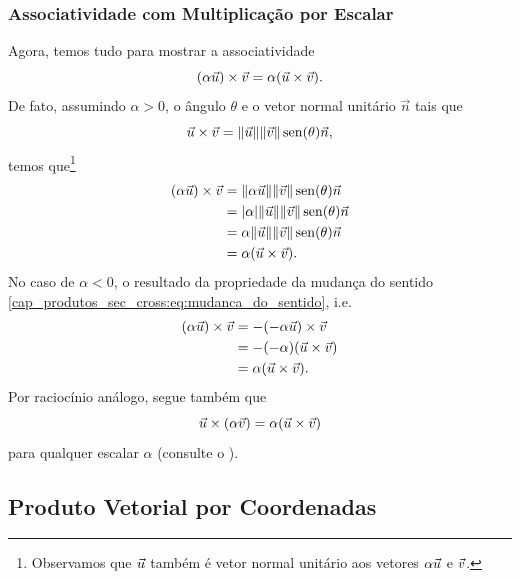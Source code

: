 \subsubsection{Associatividade com Multiplicação por Escalar}\label{cap_produtos_sec_cross:sssec:associatividade_por_escalar}

Agora, temos tudo para mostrar a associatividade
\begin{equation}
  (\alpha\vec{u})\times\vec{v} = \alpha(\vec{u}\times\vec{v}).
\end{equation}
De fato, assumindo $\alpha>0$, o ângulo $\theta$ e o vetor normal unitário $\vec{n}$ tais que
\begin{equation}
  \vec{u}\times\vec{v} = \|\vec{u}\|\|\vec{v}\|\operatorname{sen}(\theta)\vec{n},
\end{equation}
temos que\footnote{Observamos que $\protect\vec{u}$ também é vetor normal unitário aos vetores $\protect\alpha\vec{u}$ e $\protect\vec{v}$.}
\begin{align}
  (\alpha\vec{u})\times\vec{v} &= \|\alpha \vec{u}\|\|\vec{v}\|\operatorname{sen}(\theta)\vec{n}\\
  &= |\alpha|\|\vec{u}\|\|\vec{v}\|\operatorname{sen}(\theta)\vec{n}\\
  &= \alpha\|\vec{u}\|\|\vec{v}\|\operatorname{sen}(\theta)\vec{n}\\
  &= \alpha(\vec{u}\times\vec{v}).
\end{align}
No caso de $\alpha < 0$, o resultado da propriedade da mudança do sentido \eqref{cap_produtos_sec_cross:eq:mudanca_do_sentido}, i.e.
\begin{align}
  (\alpha\vec{u})\times\vec{v} &= -(-\alpha\vec{u})\times\vec{v}\\
  &= -(-\alpha)(\vec{u}\times\vec{v})\\
  &= \alpha(\vec{u}\times\vec{v}).
\end{align}
Por raciocínio análogo, segue também que
\begin{equation}
  \vec{u}\times(\alpha\vec{v}) = \alpha(\vec{u}\times\vec{v})
\end{equation}
para qualquer escalar $\alpha$ (consulte o ).


\subsection{Produto Vetorial por Coordenadas}\label{cap_prodvet_sec_coord}

